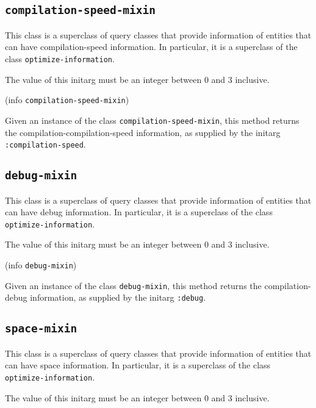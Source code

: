 \subsection{\texttt{compilation-speed-mixin}}
\label{sec-compilation-speed-mixin}

This class is a superclass of query classes that provide information
of entities that can have compilation-speed information.  In particular, it is a
superclass of the class \texttt{optimize-information}.


The value of this initarg must be an integer between $0$ and $3$
inclusive.

 {(info {\tt compilation-speed-mixin})}

Given an instance of the class \texttt{compilation-speed-mixin}, this method
returns the compilation-compilation-speed information, as supplied by the initarg
\texttt{:compilation-speed}.

\subsection{\texttt{debug-mixin}}
\label{sec-debug-mixin}

This class is a superclass of query classes that provide information
of entities that can have debug information.  In particular, it is a
superclass of the class \texttt{optimize-information}.


The value of this initarg must be an integer between $0$ and $3$
inclusive.

 {(info {\tt debug-mixin})}

Given an instance of the class \texttt{debug-mixin}, this method
returns the compilation-debug information, as supplied by the initarg
\texttt{:debug}.

\subsection{\texttt{space-mixin}}
\label{sec-space-mixin}

This class is a superclass of query classes that provide information
of entities that can have space information.  In particular, it is a
superclass of the class \texttt{optimize-information}.


The value of this initarg must be an integer between $0$ and $3$
inclusive.

